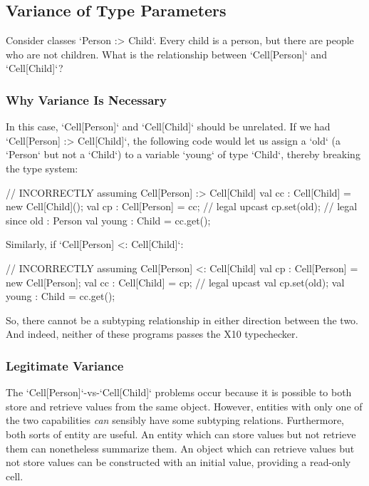 \subsection{Variance of Type Parameters}

Consider classes \xcd`Person :> Child`.  Every child is a person, but there
are people who are not children.  What is the relationship between
\xcd`Cell[Person]` and \xcd`Cell[Child]`?  

\subsubsection{Why Variance Is Necessary}

In this case, \xcd`Cell[Person]` and \xcd`Cell[Child]` should be unrelated.  
If we had \xcd`Cell[Person] :> Cell[Child]`, the following code would let us
assign a \xcd`old` (a \xcd`Person` but not a \xcd`Child`) to a
variable \xcd`young` of type \xcd`Child`, thereby breaking the type system: 
\begin{xten}
// INCORRECTLY assuming Cell[Person] :> Cell[Child]
val cc : Cell[Child] = new Cell[Child]();
val cp : Cell[Person] = cc; // legal upcast
cp.set(old);       // legal since old : Person
val young : Child = cc.get(); 
\end{xten}

Similarly, if \xcd`Cell[Person] <: Cell[Child]`: 
\begin{xten}
// INCORRECTLY assuming Cell[Person] <: Cell[Child]
val cp : Cell[Person] = new Cell[Person];
val cc : Cell[Child] = cp; // legal upcast
val cp.set(old); 
val young : Child = cc.get();
\end{xten}

So, there cannot be a subtyping relationship in either direction between the
two. And indeed, neither of these programs passes the X10 typechecker.


\subsubsection{Legitimate Variance}

The \xcd`Cell[Person]`-vs-\xcd`Cell[Child]` problems occur because it is
possible to both store and retrieve values from the same object. However,
entities with only one of the two capabilities {\em can} sensibly have some
subtyping relations. Furthermore, both sorts of entity are useful. An entity
which can store values but not retrieve them can nonetheless summarize them.
An object which can retrieve values but not store values can be constructed
with an initial value, providing a read-only cell.

